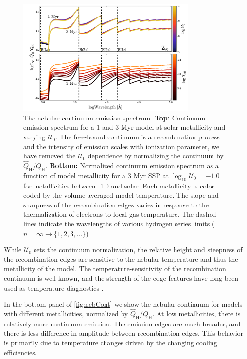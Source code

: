\documentclass[trackchanges, twocolumn, tighten]{aastex61}
\newcommand{\Fig}[1]{\autoref{fig:#1}}
\newcommand{\logten}{\ensuremath{\log_{10}}}
\newcommand{\QH}{\ensuremath{Q_{\mathrm{H}}}}
\newcommand{\QHat}{\ensuremath{\hat{Q}_{\mathrm{H}}}}
\newcommand{\U}{\ensuremath{\mathcal{U}_{0}}}
\newcommand{\logU}{\ensuremath{\logten \mathcal{U}_0}}
\begin{document}
\begin{figure} %
 \begin{centering}
    \includegraphics[width=0.8\textwidth]{f10.pdf}
    \caption{The nebular continuum emission spectrum. \textbf{Top:} Continuum emission spectrum for a 1 and 3 Myr model at solar metallicity and varying \U{}. The free-bound continuum is a recombination process and the intensity of emission scales with ionization parameter, we have removed the \U{} dependence by normalizing the continuum by $\QHat/\QH$. \textbf{Bottom:} Normalized continuum emission spectrum as a function of model metallicity for a 3 Myr SSP at $\logU=-1.0$ for metallicities between -1.0 and solar. Each metallicity is color-coded by the volume averaged model temperature. The slope and sharpness of the recombination edges varies in response to the thermalization of electrons to local gas temperature. The dashed lines indicate the wavelengths of various hydrogen series limits ($n=\infty \rightarrow \{1,2,3,\ldots\}$)}
    \label{fig:nebCont}
 \end{centering}
\end{figure}

While \U{} sets the continuum normalization, the relative height and steepness of the recombination edges are sensitive to the nebular temperature and thus the metallicity of the model. The temperature-sensitivity of the recombination continuum is well-known, and the strength of the edge features have long been used as temperature diagnostics \citep[e.g.,][]{Peimbert67}.

In the bottom panel of \Fig{nebCont} we show the nebular continuum for models with different metallicities, normalized by \QHat{}/\QH{}. At low metallicities, there is relatively more continuum emission. The emission edges are much broader, and there is less difference in amplitude between recombination edges. This behavior is primarily due to temperature changes driven by the changing cooling efficiencies.
\end{document}

